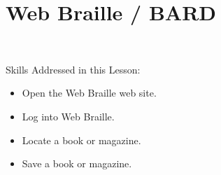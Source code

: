 \documentclass[10pt,letterpaper,twoside]{report}
\begin{document}
{{{%
\clearpage

\section{ Web Braille / BARD}
\


Skills Addressed in this Lesson:
\begin{itemize}
	\item Open the Web Braille web site.
	\item Log into Web Braille.
	\item Locate a book or magazine.
	\item Save a book or magazine.
\end{itemize}

}}}
\end{document}
